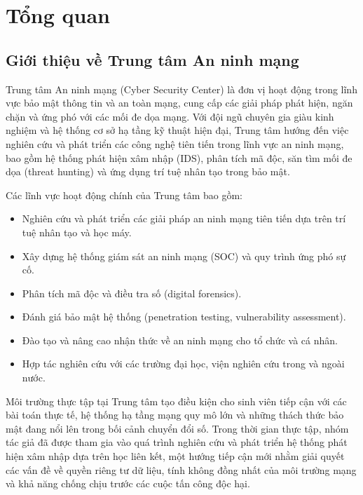 
\chapter{Tổng quan}

\section{Giới thiệu về Trung tâm An ninh mạng}
\label{sec:company}

Trung tâm An ninh mạng (Cyber Security Center) là đơn vị hoạt động trong lĩnh vực bảo mật thông tin và an toàn mạng, cung cấp các giải pháp phát hiện, ngăn chặn và ứng phó với các mối đe dọa mạng. Với đội ngũ chuyên gia giàu kinh nghiệm và hệ thống cơ sở hạ tầng kỹ thuật hiện đại, Trung tâm hướng đến việc nghiên cứu và phát triển các công nghệ tiên tiến trong lĩnh vực an ninh mạng, bao gồm hệ thống phát hiện xâm nhập (IDS), phân tích mã độc, săn tìm mối đe dọa (threat hunting) và ứng dụng trí tuệ nhân tạo trong bảo mật.

Các lĩnh vực hoạt động chính của Trung tâm bao gồm:
\begin{itemize}
    \item Nghiên cứu và phát triển các giải pháp an ninh mạng tiên tiến dựa trên trí tuệ nhân tạo và học máy.
    \item Xây dựng hệ thống giám sát an ninh mạng (SOC) và quy trình ứng phó sự cố.
    \item Phân tích mã độc và điều tra số (digital forensics).
    \item Đánh giá bảo mật hệ thống (penetration testing, vulnerability assessment).
    \item Đào tạo và nâng cao nhận thức về an ninh mạng cho tổ chức và cá nhân.
    \item Hợp tác nghiên cứu với các trường đại học, viện nghiên cứu trong và ngoài nước.
\end{itemize}

Môi trường thực tập tại Trung tâm tạo điều kiện cho sinh viên tiếp cận với các bài toán thực tế, hệ thống hạ tầng mạng quy mô lớn và những thách thức bảo mật đang nổi lên trong bối cảnh chuyển đổi số. Trong thời gian thực tập, nhóm tác giả đã được tham gia vào quá trình nghiên cứu và phát triển hệ thống phát hiện xâm nhập dựa trên học liên kết, một hướng tiếp cận mới nhằm giải quyết các vấn đề về quyền riêng tư dữ liệu, tính không đồng nhất của môi trường mạng và khả năng chống chịu trước các cuộc tấn công độc hại.

